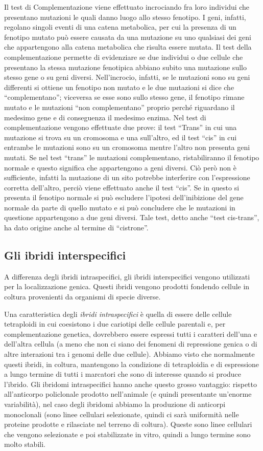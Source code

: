\documentclass[11pt]{book}
\begin{document}
Il test di Complementazione viene effettuato incrociando fra loro individui che presentano mutazioni le quali danno luogo allo stesso fenotipo. I geni, infatti, regolano singoli eventi di una catena metabolica, per cui la presenza di un fenotipo mutato può essere causata da una mutazione su uno qualsiasi dei geni che appartengono alla catena metabolica che risulta essere mutata.
Il test della complementazione permette di evidenziare se due individui o due cellule che presentano la stessa mutazione fenotipica abbiano subito una mutazione sullo stesso gene o su geni diversi.
Nell’incrocio, infatti, se le mutazioni sono su geni differenti si ottiene un fenotipo non mutato e le due mutazioni si dice che “complementano”; viceversa se esse sono sullo stesso gene, il fenotipo rimane mutato e le mutazioni “non complementano” proprio perché riguardano il medesimo gene e di conseguenza il medesimo enzima.
Nel test di complementazione vengono effettuate due prove: il test “Trans” in cui una mutazione si trova su un cromosoma e una sull’altro, ed il test “cis” in cui entrambe le mutazioni sono su un cromosoma mentre l’altro non presenta geni mutati. 
Se nel test “trans” le mutazioni complementano, ristabiliranno il fenotipo normale e questo significa che appartengono a geni diversi. Ciò però non è sufficiente, infatti la mutazione di un sito potrebbe interferire con l’espressione corretta dell’altro, perciò viene effettuato anche il test “cis”. Se in questo si presenta il fenotipo normale si può escludere l’ipotesi dell’inibizione del gene normale da parte di quello mutato e si può concludere che le mutazioni in questione appartengono a due geni diversi.
Tale test, detto anche “test cis-trans”, ha dato origine anche al termine di “cistrone”.

\subsection{Gli ibridi interspecifici}
A differenza degli ibridi intraspecifici, gli ibridi interspecifici vengono utilizzati per la localizzazione genica.
Questi ibridi vengono prodotti fondendo cellule in coltura provenienti da organismi di specie diverse.

Una caratteristica degli \emph{ibridi intraspecifici} è quella di essere delle cellule tetraploidi in cui coesistono i due cariotipi delle cellule parentali e, per complementazione genetica, dovrebbero essere espressi tutti i caratteri dell’una e dell’altra cellula (a meno che non ci siano dei fenomeni di repressione genica o di altre interazioni tra i genomi delle due cellule). 
Abbiamo visto che normalmente questi ibridi, in coltura, mantengono la condizione di tetraploidia e di espressione a lungo termine di tutti i marcatori che sono di interesse quando si produce l’ibrido. 
Gli ibridomi intraspecifici hanno anche questo grosso vantaggio: rispetto all’anticorpo policlonale prodotto nell’animale (e quindi presentante un’enorme variabilità), nel caso degli ibridomi abbiamo la produzione di anticorpi monoclonali (sono linee cellulari selezionate, quindi ci sarà uniformità nelle proteine prodotte e rilasciate nel terreno di coltura). Queste sono linee cellulari che vengono selezionate e poi stabilizzate in vitro, quindi a lungo termine sono molto stabili.
\end{document}

